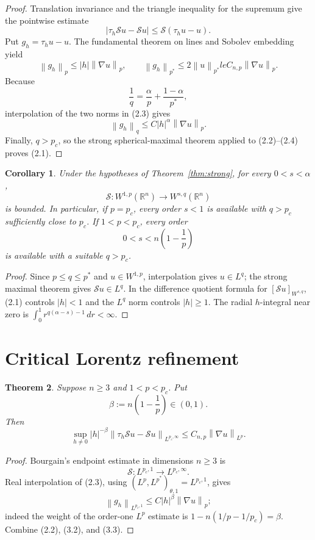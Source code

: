 \documentclass[11pt]{article}
\newtheorem{theorem}{Theorem}
\newtheorem{corollary}[theorem]{Corollary}
\newcommand{\norm}[1]{\left\lVert#1\right\rVert}
\newcommand{\R}{\mathbb R}
\newcommand{\Sph}{\mathcal S}
\newcommand{\tauh}{\tau_h}
\begin{document}
\begin{proof}
Translation invariance and the triangle inequality for the supremum give
the pointwise estimate
\[
 |\tauh\Sph u-\Sph u|\le \Sph(\tauh u-u).             \tag{2.2}
\]
Put $g_h=\tauh u-u$.  The fundamental theorem on lines and Sobolev
embedding yield
\[
 \norm{g_h}_{p}\le |h|\norm{\nabla u}_{p},\qquad
 \norm{g_h}_{p^*}\le2\norm{u}_{p^*}le C_{n,p}\norm{\nabla u}_{p}.
                                                                    \tag{2.3}
\]
Because
\[
 \frac1q=\frac\alpha p+\frac{1-\alpha}{p^*},
\]
interpolation of the two norms in (2.3) gives
\[
 \norm{g_h}_{q}\le C|h|^\alpha\norm{\nabla u}_{p}.     \tag{2.4}
\]
Finally, $q>p_c$, so the strong spherical-maximal theorem applied to
(2.2)--(2.4) proves (2.1).
\end{proof}

\begin{corollary}\label{cor:frac}
Under the hypotheses of Theorem~\ref{thm:strong}, for every $0<s<\alpha$,
\[
 \Sph:W^{1,p}(\R^n)\longrightarrow W^{s,q}(\R^n)
\]
is bounded.  In particular, if $p=p_c$, every order $s<1$ is available
with $q>p_c$ sufficiently close to $p_c$.  If $1<p<p_c$, every order
\[
 0<s<n\left(1-\frac1p\right)                           \tag{2.5}
\]
is available with a suitable $q>p_c$.
\end{corollary}

\begin{proof}
Since $p\le q\le p^*$ and $u\in W^{1,p}$, interpolation gives $u\in L^q$;
the strong maximal theorem gives $\Sph u\in L^q$.  In the difference
quotient formula for $[\Sph u]_{W^{s,q}}$, (2.1) controls $|h|<1$ and
the $L^q$ norm controls $|h|\ge1$.  The radial $h$-integral near zero is
$\int_0^1 r^{q(\alpha-s)-1}\,dr<\infty$.
\end{proof}

\section{Critical Lorentz refinement}

\begin{theorem}\label{thm:lorentz}
Suppose $n\ge3$ and $1<p<p_c$.  Put
\[
 \beta:=n\left(1-\frac1p\right)\in(0,1).
\]
Then
\[
 \sup_{h\ne0}|h|^{-\beta}
 \norm{\tauh\Sph u-\Sph u}_{L^{p_c,\infty}}
 \le C_{n,p}\norm{\nabla u}_{L^p}.                   \tag{3.1}
\]
\end{theorem}

\begin{proof}
Bourgain's endpoint estimate in dimensions $n\ge3$ is
\[
 \Sph:L^{p_c,1}\longrightarrow L^{p_c,\infty}.        \tag{3.2}
\]
Real interpolation of (2.3), using
$(L^p,L^{p^*})_{\theta,1}=L^{p_c,1}$, gives
\[
 \norm{g_h}_{L^{p_c,1}}
 \le C|h|^\beta\norm{\nabla u}_{p};                   \tag{3.3}
\]
indeed the weight of the order-one $L^p$ estimate is
$1-n(1/p-1/p_c)=\beta$.  Combine (2.2), (3.2), and (3.3).
\end{proof}
\end{document}
